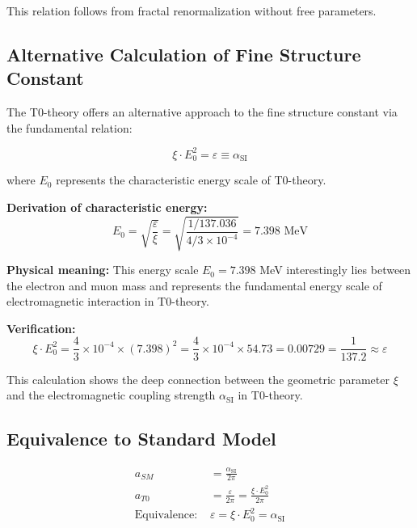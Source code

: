 \documentclass[12pt,a4paper]{article}
\numberwithin{equation}{section}
\newcommand{\xipar}{\xi}
\newcommand{\epsilonT}{\varepsilon}
\newcommand{\alphaSI}{\alpha_{\text{SI}}}
\newcommand{\Eo}{E_0}
\begin{document}
	This relation follows from fractal renormalization without free parameters.
	
	\subsection{Alternative Calculation of Fine Structure Constant}
	
	The T0-theory offers an alternative approach to the fine structure constant via the fundamental relation:
	
	\begin{equation}
		\xipar \cdot \Eo^2 = \epsilonT \equiv \alphaSI
		\label{eq:alpha_alternative}
	\end{equation}
	
	where $\Eo$ represents the characteristic energy scale of T0-theory.
	
	\textbf{Derivation of characteristic energy:}
	\begin{equation}
		\Eo = \sqrt{\frac{ \epsilonT}{\xipar}} = \sqrt{\frac{1/137.036}{4/3 \times 10^{-4}}} = 7.398 \text{ MeV}
		\label{eq:e0_derivation}
	\end{equation}
	
	\textbf{Physical meaning:}
	This energy scale $\Eo = 7.398$ MeV interestingly lies between the electron and muon mass and represents the fundamental energy scale of electromagnetic interaction in T0-theory.
	
	\textbf{Verification:}
	\begin{equation}
		\xipar \cdot \Eo^2 = \frac{4}{3} \times 10^{-4} \times (7.398)^2 = \frac{4}{3} \times 10^{-4} \times 54.73 = 0.00729 = \frac{1}{137.2} \approx  \epsilonT
		\label{eq:alpha_verification}
	\end{equation}
	
	This calculation shows the deep connection between the geometric parameter $\xipar$ and the electromagnetic coupling strength $\alphaSI$ in T0-theory.
	
	\subsection{Equivalence to Standard Model}
	
	\begin{align}
		a_{SM} &= \frac{\alphaSI}{2\pi} \\
		a_{T0} &= \frac{\epsilonT}{2\pi} = \frac{\xipar \cdot \Eo^2}{2\pi} \\
		\text{Equivalence: } &\epsilonT = \xipar \cdot \Eo^2 = \alphaSI
	\end{align}
	
\end{document}
